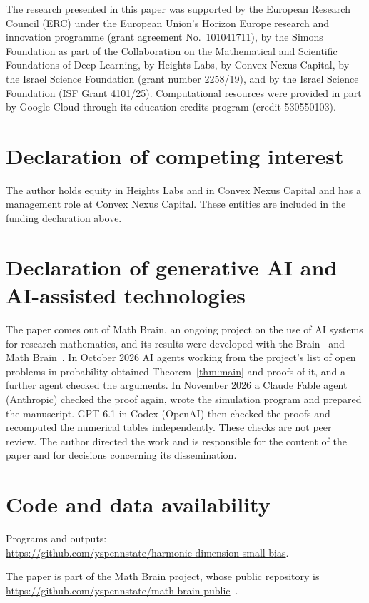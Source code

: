 \documentclass[11pt]{amsart}
\theoremstyle{definition}
\begin{document}
The research presented in this paper was supported by the European Research Council (ERC) under the European Union's
Horizon Europe research and innovation programme (grant agreement No.~101041711), by the Simons Foundation as part of
the Collaboration on the Mathematical and Scientific Foundations of Deep Learning, by Heights Labs, by Convex Nexus
Capital, by the Israel Science Foundation (grant number 2258/19), and by the Israel Science Foundation (ISF Grant
4101/25). Computational resources were provided in part by Google Cloud through its education credits program (credit
530550103).

\section*{Declaration of competing interest}
The author holds equity in Heights Labs and in Convex Nexus Capital and has a management role at Convex Nexus Capital.
These entities are included in the funding declaration above.

\section*{Declaration of generative AI and AI-assisted technologies}
The paper comes out of Math Brain, an ongoing project on the use of AI systems for research mathematics, and its
results were developed with the Brain~\cite{BrainFramework} and Math Brain~\cite{MathBrainRepo}. In October 2026
AI agents working from the project's list of open problems in probability obtained Theorem~\ref{thm:main} and
proofs of it, and a further agent checked the arguments. In November 2026 a
Claude Fable agent (Anthropic) checked the proof again, wrote the simulation program and prepared the manuscript. GPT-6.1 in Codex (OpenAI) then checked
the proofs and recomputed the numerical tables independently.
These checks are not peer review. The author directed the work and is responsible for the content of the paper and
for decisions concerning its dissemination.

\section*{Code and data availability}
Programs and outputs:\\
\url{https://github.com/yspennstate/harmonic-dimension-small-bias}.

The paper is part of the Math Brain project, whose public repository is
\url{https://github.com/yspennstate/math-brain-public}~\cite{MathBrainRepo}.
\end{document}
